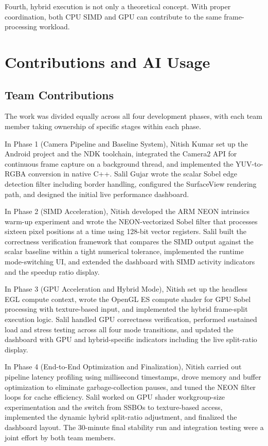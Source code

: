 \documentclass[12pt,a4paper]{article}
\begin{document}
Fourth, hybrid execution is not only a theoretical concept. With proper coordination, both CPU SIMD and GPU can contribute to the same frame-processing workload.

\section{Contributions and AI Usage}

\subsection{Team Contributions}

The work was divided equally across all four development phases, with each team member taking ownership of specific stages within each phase.

In Phase 1 (Camera Pipeline and Baseline System), Nitish Kumar set up the Android project and the NDK toolchain, integrated the Camera2 API for continuous frame capture on a background thread, and implemented the YUV-to-RGBA conversion in native C++. Salil Gujar wrote the scalar Sobel edge detection filter including border handling, configured the SurfaceView rendering path, and designed the initial live performance dashboard.

In Phase 2 (SIMD Acceleration), Nitish developed the ARM NEON intrinsics warm-up experiment and wrote the NEON-vectorized Sobel filter that processes sixteen pixel positions at a time using 128-bit vector registers. Salil built the correctness verification framework that compares the SIMD output against the scalar baseline within a tight numerical tolerance, implemented the runtime mode-switching UI, and extended the dashboard with SIMD activity indicators and the speedup ratio display.

In Phase 3 (GPU Acceleration and Hybrid Mode), Nitish set up the headless EGL compute context, wrote the OpenGL ES compute shader for GPU Sobel processing with texture-based input, and implemented the hybrid frame-split execution logic. Salil handled GPU correctness verification, performed sustained load and stress testing across all four mode transitions, and updated the dashboard with GPU and hybrid-specific indicators including the live split-ratio display.

In Phase 4 (End-to-End Optimization and Finalization), Nitish carried out pipeline latency profiling using millisecond timestamps, drove memory and buffer optimization to eliminate garbage-collection pauses, and tuned the NEON filter loops for cache efficiency. Salil worked on GPU shader workgroup-size experimentation and the switch from SSBOs to texture-based access, implemented the dynamic hybrid split-ratio adjustment, and finalized the dashboard layout. The 30-minute final stability run and integration testing were a joint effort by both team members.
\end{document}
